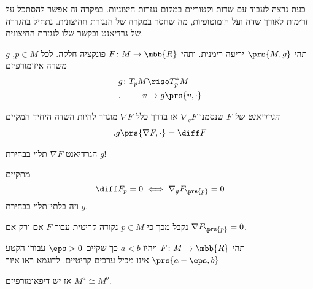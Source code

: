 \documentclass[a4paper,10pt,twoside,openany]{book}
\begin{document}
כעת נרצה לעבוד עם שדות וקטוריים במקום נגזרות חיצוניות. במקרה זה אפשר להסתכל על זרימות לאורך שדה ועל הומוטופיות, מה שחסר במקרה של הנגזרת חהיצונית. נתחיל בהגדרה של גרדיאנט ובקשר שלו לנגזרת החיצונית.

\begin{definition}[גרדיאנט]
תהי
$\prs{M,g}$
יריעה רימנית.
ותהי
$F \colon M \to \mbb{R}$
פונקציה חלקה.
לכל
$p \in M$,
$g$
משרה איזומורפיזם
\begin{align*}
g \colon T_p M &\riso T_p^* M \\
\text{.} \hphantom{lalala} v &\mapsto g\prs{v, \cdot}
\end{align*}

\emph{הגרדיאנט של
$F$}
שנסמנו
$\nabla_g F$
או בדרך כלל
$\nabla F$
מוגדר להיות השדה היחיד המקיים
\begin{align*}
\text{.} g\prs{\nabla F, \cdot} = \diff F
\end{align*}
\end{definition}

\begin{remark}
הגרדיאנט
$\nabla F$
תלוי בבחירת
$g$!
\end{remark}

\begin{remark}
מתקיים
\[\diff F_p = 0 \iff \nabla_g F_{\prs{p}} = 0\]
וזה בלתי־תלוי בבחירת
$g$.

נקבל מכך כי
$p \in M$
נקודה קריטית עבור
$F$
אם ורק אם
$\nabla F_{\prs{p}} = 0$.
\end{remark}

\begin{proposition}
תהי
$F \colon M \to \mbb{R}$
ויהיו
$a < b$
כך שקיים
$\eps > 0$
עבורו הקטע
$\prs{a-\eps, b}$
אינו מכיל ערכים קריטיים.
לדוגמא ראו איור

אז יש דיפאומורפיזם
$M^a \cong M^b$.
\end{proposition}
\end{document}
